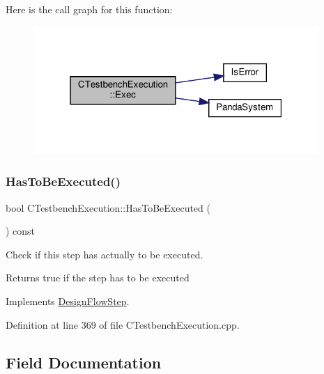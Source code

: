 Here is the call graph for this function\+:
\nopagebreak
\begin{figure}[H]
\begin{center}
\leavevmode
\includegraphics[width=307pt]{db/dfb/classCTestbenchExecution_a8c357be38d34d8472d3ed3914ec14aef_cgraph}
\end{center}
\end{figure}
\mbox{\label{classCTestbenchExecution_a33f54e90fb5810ea5df6adb1512f87bb}} 
\subsubsection{\texorpdfstring{Has\+To\+Be\+Executed()}{HasToBeExecuted()}}
{\footnotesize\ttfamily bool C\+Testbench\+Execution\+::\+Has\+To\+Be\+Executed (\begin{DoxyParamCaption}{ }\end{DoxyParamCaption}) const\hspace{0.3cm}{\ttfamily [virtual]}}



Check if this step has actually to be executed. 

\begin{DoxyReturn}{Returns}
true if the step has to be executed 
\end{DoxyReturn}


Implements \hyperlink{classDesignFlowStep_a1783abe0c1d162a52da1e413d5d1ef05}{Design\+Flow\+Step}.



Definition at line 369 of file C\+Testbench\+Execution.\+cpp.



\subsection{Field Documentation}
\mbox{\label{classCTestbenchExecution_a9394f004c8c52a187243f5c924180d80}} 
